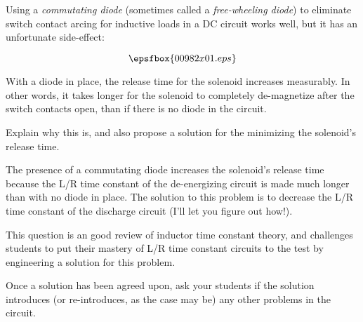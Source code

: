 

Using a {\it commutating diode} (sometimes called a {\it free-wheeling diode}) to eliminate switch contact arcing for inductive loads in a DC circuit works well, but it has an unfortunate side-effect:

$$\epsfbox{00982x01.eps}$$

With a diode in place, the release time for the solenoid increases measurably.  In other words, it takes longer for the solenoid to completely de-magnetize after the switch contacts open, than if there is no diode in the circuit.

Explain why this is, and also propose a solution for the minimizing the solenoid's release time.







The presence of a commutating diode increases the solenoid's release time because the L/R time constant of the de-energizing circuit is made much longer than with no diode in place.  The solution to this problem is to decrease the L/R time constant of the discharge circuit (I'll let you figure out how!).







This question is an good review of inductor time constant theory, and challenges students to put their mastery of L/R time constant circuits to the test by engineering a solution for this problem.

Once a solution has been agreed upon, ask your students if the solution introduces (or re-introduces, as the case may be) any other problems in the circuit.



